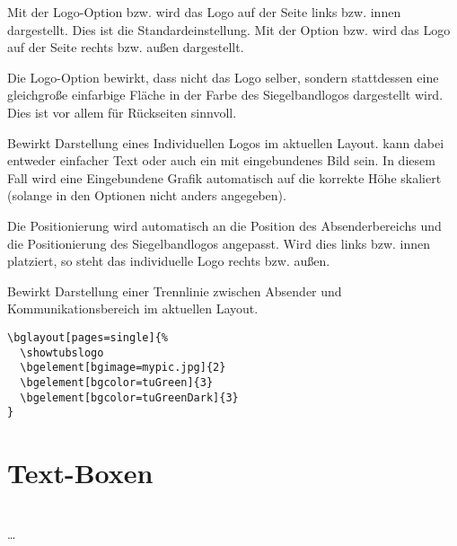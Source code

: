 Mit der Logo-Option  bzw.  wird das Logo auf der Seite
links bzw. innen dargestellt. Dies ist die Standardeinstellung.
Mit der Option  bzw.  wird das Logo auf der
Seite rechts bzw. außen dargestellt.

\begin{Declaration}
\end{Declaration}

Die Logo-Option  bewirkt, dass nicht das Logo selber,
sondern stattdessen eine gleichgroße einfarbige Fläche in der Farbe
des Siegelbandlogos dargestellt wird.
Dies ist vor allem für Rückseiten sinnvoll.


\begin{Declaration}
\end{Declaration}

Bewirkt Darstellung eines Individuellen Logos im aktuellen Layout.
 kann dabei entweder einfacher Text oder auch ein 
mit  eingebundenes Bild sein.
In diesem Fall wird eine Eingebundene Grafik automatisch auf die korrekte
Höhe skaliert (solange in den Optionen nicht anders angegeben).

Die Positionierung wird automatisch an die Position des Absenderbereichs und
die Positionierung des Siegelbandlogos angepasst.
Wird dies links bzw. innen platziert, so steht das individuelle
Logo rechts bzw. außen.

\begin{Declaration}
\end{Declaration}

Bewirkt Darstellung einer Trennlinie zwischen Absender und Kommunikationsbereich
im aktuellen Layout.

\begin{lstlisting}[captionpos=b,caption={Beispiel-Nutzung von bglayout}]
\bglayout[pages=single]{%
  \showtubslogo
  \bgelement[bgimage=mypic.jpg]{2}
  \bgelement[bgcolor=tuGreen]{3}
  \bgelement[bgcolor=tuGreenDark]{3}
}
\end{lstlisting}


\section{Text-Boxen}

\begin{Declaration}
          \\
  \quad\dots\\
\end{Declaration}

